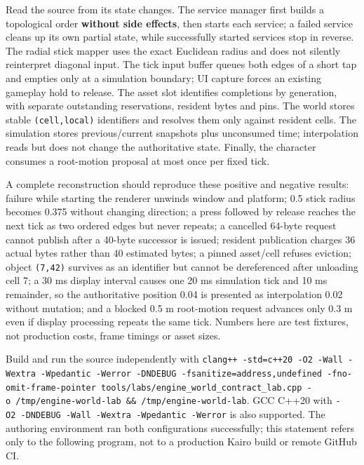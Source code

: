 Read the source from its state changes. The service manager first builds a topological order \textbf{without side effects}, then starts each service; a failed service cleans up its own partial state, while successfully started services stop in reverse. The radial stick mapper uses the exact Euclidean radius and does not silently reinterpret diagonal input. The tick input buffer queues both edges of a short tap and empties only at a simulation boundary; UI capture forces an existing gameplay hold to release. The asset slot identifies completions by generation, with separate outstanding reservations, resident bytes and pins. The world stores stable \texttt{(cell,local)} identifiers and resolves them only against resident cells. The simulation stores previous/current snapshots plus unconsumed time; interpolation reads but does not change the authoritative state. Finally, the character consumes a root-motion proposal at most once per fixed tick.

A complete reconstruction should reproduce these positive and negative results: failure while starting the renderer unwinds window and platform; 0.5 stick radius becomes 0.375 without changing direction; a press followed by release reaches the next tick as two ordered edges but never repeats; a cancelled 64-byte request cannot publish after a 40-byte successor is issued; resident publication charges 36 actual bytes rather than 40 estimated bytes; a pinned asset/cell refuses eviction; object \texttt{(7,42)} survives as an identifier but cannot be dereferenced after unloading cell 7; a 30 ms display interval causes one 20 ms simulation tick and 10 ms remainder, so the authoritative position 0.04 is presented as interpolation 0.02 without mutation; and a blocked 0.5 m root-motion request advances only 0.3 m even if display processing repeats the same tick. Numbers here are test fixtures, not production costs, frame timings or asset sizes.

Build and run the source independently with \texttt{clang++\ -std=c++20\ -O2\ -Wall\ -Wextra\ -Wpedantic\ -Werror\ -DNDEBUG\ -fsanitize=address,undefined\ -fno-omit-frame-pointer\ tools/labs/engine\_world\_contract\_lab.cpp\ -o\ /tmp/engine-world-lab\ \&\&\ /tmp/engine-world-lab}. GCC C++20 with \texttt{-O2\ -DNDEBUG\ -Wall\ -Wextra\ -Wpedantic\ -Werror} is also supported. The authoring environment ran both configurations successfully; this statement refers only to the following program, not to a production Kairo build or remote GitHub CI.

